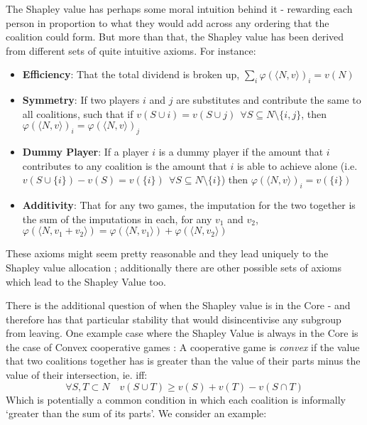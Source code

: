 The Shapley value has perhaps some moral intuition behind it - rewarding each person in proportion to what they would add across any ordering that the coalition could form.
But more than that, the Shapley value has been derived from different sets of quite intuitive axioms.
For instance:

\begin{itemize}
\item	\textbf{Efficiency}: That the total dividend is broken up, $\sum_i\varphi(\langle N,v\rangle)_i = v(N)$
\item	\textbf{Symmetry}: If two players $i$ and $j$ are substitutes and contribute the same to all coalitions, such that if $v(S\cup i)=v(S\cup j)~~\forall S\subseteq N\setminus\{i,j\}$, then $\varphi(\langle N,v\rangle)_i = \varphi(\langle N,v\rangle)_j$
\item	\textbf{Dummy Player}: If a player $i$ is a dummy player if the amount that $i$ contributes to any coalition is the amount that $i$ is able to achieve alone (i.e.\ $v(S\cup \{i\})-v(S)=v(\{i\})~~\forall S\subseteq N\setminus\{i\}$) then $\varphi(\langle N,v\rangle)_i=v(\{i\})$
\item	\textbf{Additivity}: That for any two games, the imputation for the two together is the sum of the imputations in each, for any $v_1$ and $v_2$, $\varphi(\langle N,v_1+v_2\rangle)=\varphi(\langle N,v_1 \rangle) + \varphi(\langle N,v_2\rangle)$
\end{itemize}

These axioms might seem pretty reasonable and they lead uniquely to the Shapley value allocation \cite{Shapley1953a}; additionally there are other possible sets of axioms which lead to the Shapley Value too.

There is the additional question of when the Shapley value is in the Core - and therefore has that particular stability that would disincentivise any subgroup from leaving.
One example case where the Shapley Value is always in the Core is the case of Convex cooperative games \cite[Chapter 6]{RePEc:cup:cbooks:9781107691322}:
A cooperative game is \textit{convex} if the value that two coalitions together has is greater than the value of their parts minus the value of their intersection, ie. iff:
\begin{equation}
    \forall S,T\subset N \quad v(S\cup T) \ge v(S)+v(T)-v(S\cap T)
\end{equation}
Which is potentially a common condition in which each coalition is informally `greater than the sum of its parts'.
We consider an example:

